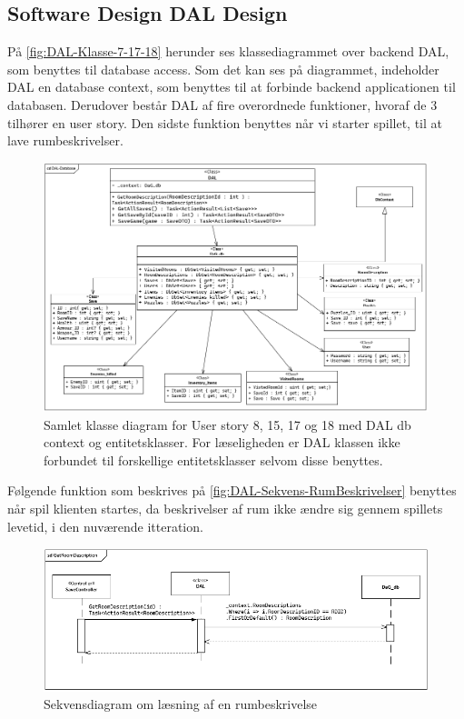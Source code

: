 \subsection{Software Design DAL Design}
På \autoref{fig:DAL-Klasse-7-17-18} herunder ses klassediagrammet over backend DAL, som benyttes til database access. 
Som det kan ses på diagrammet, indeholder DAL en database context, som benyttes til at forbinde backend applicationen til databasen. 
Derudover består DAL af fire overordnede funktioner, hvoraf de 3 tilhører en user story. 
Den sidste funktion benyttes når vi starter spillet, til at lave rumbeskrivelser.\\

\begin{figure}[H]
\centering
\includegraphics[width = \textwidth]{02-Body/Images/DAL-Database/DAL-DB-CD.PNG}
\caption{Samlet klasse diagram for User story 8, 15, 17 og 18 med DAL db context og entitetsklasser.
For læseligheden er DAL klassen ikke forbundet til forskellige entitetsklasser selvom disse benyttes.}
\label{fig:DAL-Klasse-7-17-18}
\end{figure}

Følgende funktion som beskrives på \autoref{fig:DAL-Sekvens-RumBeskrivelser} benyttes når spil klienten startes, da beskrivelser af rum ikke ændre sig gennem spillets levetid, i den nuværende itteration.\\

\begin{figure}[H]
\centering
\includegraphics[width = \textwidth]{02-Body/Images/DAL-Database/RoomDescriptionSd.PNG}
\caption{Sekvensdiagram om læsning af en rumbeskrivelse}
\label{fig:DAL-Sekvens-RumBeskrivelser}
\end{figure}

